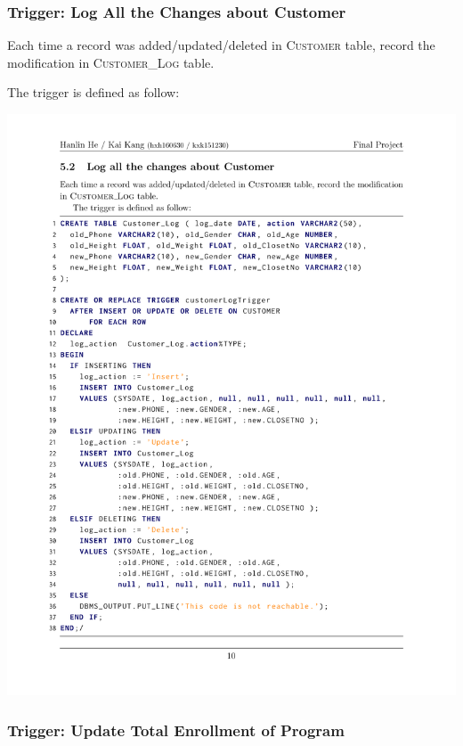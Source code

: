 \documentclass{beamer}
\begin{document}
\begin{frame}
\frametitle{Trigger: Log All the Changes about Customer}
Each time a record was added/updated/deleted in \textsc{Customer} table,
record the modification in \textsc{Customer\_Log} table.

The trigger is defined as follow:

\centering
\includegraphics[height=.7\textheight]{src/customerLogTrigger}
\end{frame}

\begin{frame}
\frametitle{Trigger: Update Total Enrollment of Program}

\end{frame}
\end{document}
